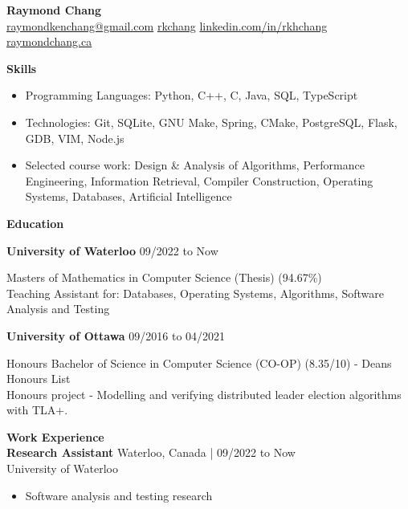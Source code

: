 \documentclass[10pt]{article}
\begin{document}
\begin{center}
    {\huge\textbf{Raymond Chang}} \\
     \href{mailto:raymondkenchang@gmail.com}{raymondkenchang@gmail.com}  \space\space
     \href{https://github.com/rkchang}{rkchang} \space\space
     \href{https://linkedin.com/in/rkhchang}{linkedin.com/in/rkhchang} \space\space
     \href{https://raymondchang.ca/}{raymondchang.ca} \\ \end{center}

{\Large\textbf{Skills}}\space \hrulefill
\begin{itemize}
    \item Programming Languages: Python, C++, C, Java, SQL, TypeScript
    \item Technologies: Git, SQLite, GNU Make, Spring, CMake, PostgreSQL, Flask, GDB, VIM, Node.js
    \item Selected course work: Design \& Analysis of Algorithms, Performance Engineering, Information Retrieval, Compiler Construction, Operating Systems, Databases, Artificial Intelligence 
\end{itemize}

\smallskip

{\Large\textbf{Education}}\space \hrulefill

\textbf{University of Waterloo} \hfill  09/2022 to Now

Masters of Mathematics in Computer Science (Thesis) (94.67\%) \\
Teaching Assistant for: Databases, Operating Systems, Algorithms, Software Analysis and Testing

\textbf{University of Ottawa} \hfill 09/2016 to 04/2021

Honours Bachelor of Science in Computer Science (CO-OP) (8.35/10) - Deans Honours List \\ 
Honours project - Modelling and verifying distributed leader election algorithms with TLA+.

\smallskip

{\Large\textbf{Work Experience}}\space \hrulefill \\
\textbf{Research Assistant} \hfill Waterloo, Canada | 09/2022 to Now \\
University of Waterloo
\begin{itemize}
    \item Software analysis and testing research 
\end{itemize}
\end{document}
